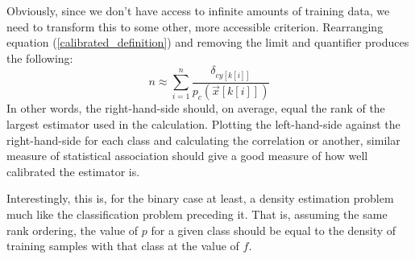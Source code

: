 \documentclass{article}
\newcommand{\binarydecision}{f}
\newcommand{\estimator}{{p}}
\newcommand{\coord}{x}
\newcommand{\ord}{y}
\begin{document}
Obviously, since we don't have access to infinite amounts of training data,
we need to transform this to some other, more accessible criterion.
Rearranging equation (\ref{calibrated_definition}) and removing the limit and
quantifier produces the following:
\begin{equation}
	n \approx \sum_{i=1}^n \frac{\delta_{c\ord[k[i]]}}{\estimator_c\left (\vec \coord[k[i]] \right )}
\end{equation}
In other words, the right-hand-side should, on average, equal the rank of the
largest estimator used in the calculation.
Plotting the left-hand-side against the right-hand-side for each class and
calculating the correlation or another, similar measure of statistical
association should give a good measure of how well calibrated the
estimator is.

Interestingly, this is, for the binary case at least, a density estimation
problem much like the classification problem preceding it.
That is, assuming the same rank ordering, the value of
$\estimator$ for a given class should be equal to the density of training
samples with that class at the value of $\binarydecision$.
\end{document}
